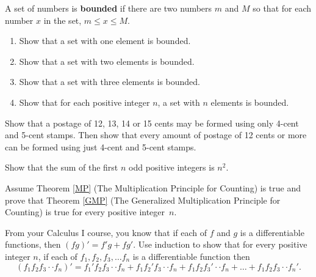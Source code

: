 \begin{prb}
A set of numbers is \textbf{bounded} if there are two numbers $m$ and $M$ so that for each number $x$ in the set, $m \leq x \leq M$.
\begin{enumerate}
\item Show that a set with one element is bounded.
\item Show that a set with two elements is bounded.
\item Show that a set with three elements is bounded.
\item Show that for each positive integer $n$, a set with $n$ elements is bounded.
\end{enumerate}
\end{prb}

\begin{prb}\label{prb:postage}
Show that a postage of 12, 13, 14 or 15 cents may be formed using only 4-cent and 5-cent stamps.  Then show that every amount of postage of 12 cents or more can be formed using just 4-cent and 5-cent stamps.
\begin{annotation}
\end{annotation}
\end{prb}

\begin{prb}
Show that the sum of the first $n$ odd positive integers is $n^2$.
\end{prb}

\begin{prb}
Assume
Theorem \ref{MP} (The Multiplication Principle for Counting) is true and prove that Theorem \ref{GMP} (The Generalized Multiplication Principle for Counting) is true for every positive integer~$n$.
\end{prb}

\begin{prb}
From your Calculus I course, you know that if each of $f$ and $g$ is a differentiable functions, then $(fg)' = f'g + fg'$.
Use induction to show that for every positive integer $n$, if each of $f_1, f_2, f_3, \dots f_n$ is a differentiable function then
$$\left( f_1 f_2 f_3 \cdot\cdot f_n \right)' = f_1' f_2 f_3 \cdot\cdot f_n + f_1 f_2' f_3 \cdot\cdot f_n + f_1 f_2 f_3' \cdot\cdot f_n + \dots + f_1 f_2 f_3 \cdot\cdot f_n'.$$
\end{prb}


